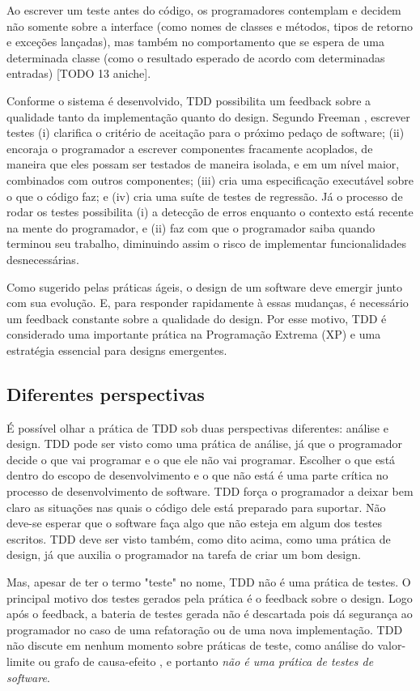 Ao escrever um teste antes do código, os programadores contemplam e decidem não somente sobre a interface (como nomes de classes e 
métodos, tipos de retorno e exceções lançadas), mas também no comportamento que se espera de uma determinada classe 
(como o resultado esperado de acordo com determinadas entradas) [TODO 13 aniche].

Conforme o sistema é desenvolvido, TDD possibilita um feedback sobre a qualidade tanto da implementação quanto do design. Segundo 
Freeman \cite{GOOS}, escrever testes (i) clarifica o critério de aceitação para o próximo pedaço de software; (ii) encoraja o programador
a escrever componentes fracamente acoplados, de maneira que eles possam ser testados de maneira isolada, e em um nível maior, combinados
com outros componentes; (iii) cria uma especificação executável sobre o que o código faz; e (iv) cria uma suíte de testes de regressão.
Já o processo de rodar os testes possibilita (i) a detecção de erros enquanto o contexto está recente na mente do programador, e (ii)
faz com que o programador saiba quando terminou seu trabalho, diminuindo assim o risco de implementar funcionalidades desnecessárias.

Como sugerido pelas práticas ágeis,
o design de um software deve emergir junto com sua evolução. E, para responder rapidamente à essas mudanças, é necessário
um feedback constante sobre a qualidade do design. Por esse motivo, TDD é considerado uma importante prática na Programação 
Extrema (XP) \cite{XPExplained} e uma estratégia essencial para designs emergentes.

\subsection{Diferentes perspectivas}

É possível olhar a prática de TDD sob duas perspectivas diferentes: análise e design. 
TDD pode ser visto como uma prática de análise, já que o programador decide o que vai programar e o que ele não vai programar. Escolher o que
está dentro do escopo de desenvolvimento e o que não está é uma parte crítica no processo de desenvolvimento de software. TDD força
o programador a deixar bem claro as situações nas quais o código dele está preparado para suportar. Não deve-se esperar que
o software faça algo que não esteja em algum dos testes escritos.
TDD deve ser visto também, como dito acima, como uma prática de design, já que auxilia o programador na tarefa de criar um bom
design. 

Mas, apesar de ter o termo "teste" no nome, TDD não é uma prática de testes. O principal motivo dos testes gerados pela prática é o
feedback sobre o design. Logo após o feedback, a bateria de testes gerada não é descartada pois dá segurança ao programador no caso de uma refatoração
ou de uma nova implementação. TDD não discute em nenhum momento sobre práticas de teste, como análise do valor-limite ou
grafo de causa-efeito \cite{art-of-sw-testing}, e portanto \textit{não é uma prática de testes de software}.

